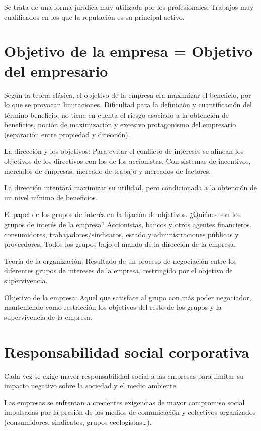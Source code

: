 \documentclass[12pt, twoside, openright]{report} %
\begin{document}
Se trata de una forma jurídica muy utilizada por los profesionales: Trabajos muy cualificados en los que la
reputación es su principal activo.

\section{Objetivo de la empresa = Objetivo del empresario}

Según la teoría clásica, el objetivo de la empresa era maximizar el beneficio, por lo que se provocan
limitaciones. Dificultad para la definición y cuantificación del término beneficio, no tiene en cuenta el riesgo
asociado a la obtención de beneficios, noción de maximización y excesivo protagonismo del empresario
(separación entre propiedad y dirección).

La dirección y los objetivos: Para evitar el conflicto de intereses se alinean los objetivos de los directivos con
los de los accionistas. Con sistemas de incentivos, mercados de empresas, mercado de trabajo y mercados
de factores.

La dirección intentará maximizar su utilidad, pero condicionada a la obtención de un nivel mínimo de
beneficios.

El papel de los grupos de interés en la fijación de objetivos. ¿Quiénes son los grupos de interés de la
empresa? Accionistas, bancos y otros agentes financieros, consumidores, trabajadores/sindicatos, estado y
administraciones públicas y proveedores. Todos los grupos bajo el mando de la dirección de la empresa.

Teoría de la organización: Resultado de un proceso de negociación entre los diferentes grupos de intereses
de la empresa, restringido por el objetivo de supervivencia.

Objetivo de la empresa: Aquel que satisface al grupo con más poder negociador, manteniendo como
restricción los objetivos del resto de los grupos y la supervivencia de la empresa.

\section{Responsabilidad social corporativa}

Cada vez se exige mayor responsabilidad social a las empresas para limitar su impacto negativo sobre la
sociedad y el medio ambiente.

Las empresas se enfrentan a crecientes exigencias de mayor compromiso social impulsadas por la presión de
los medios de comunicación y colectivos organizados (consumidores, sindicatos, grupos ecologistas…).
\end{document}
